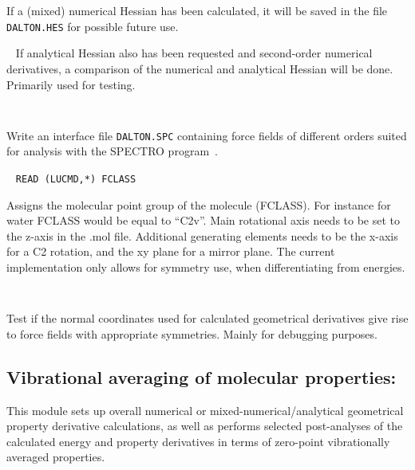 \begin{description}
If a (mixed) numerical Hessian has been calculated, it will be saved
in the file \verb|DALTON.HES| for possible future use.

\item[\Key{SDRTST}]\verb| |\newline
If analytical Hessian also has been requested and second-order
numerical derivatives, a comparison of the numerical and analytical
Hessian will be done. Primarily used for testing.

\item[\Key{SPECTRO INTERFACE}]\verb| |\newline

Write an interface file \verb|DALTON.SPC| containing force fields of
different orders suited for analysis with the SPECTRO
program~\cite{spectroref}.

\item[\Key{SYMMET}]\verb| |\newline
\verb|READ (LUCMD,*) FCLASS|

Assigns the molecular point group of the molecule (FCLASS). For
instance for water FCLASS would be equal to ``C2v''. Main rotational
axis needs to be set to the z-axis in the .mol file. Additional
generating elements needs to be the x-axis for a C2 rotation, and the
xy plane for a mirror plane. The current implementation only allows
for symmetry use, when differentiating from energies. 

\item[\Key{TEST N}]\verb| |\newline

Test if the normal coordinates used for calculated geometrical
derivatives give rise to force fields with appropriate
symmetries. Mainly for debugging purposes.

\end{description}

\subsection{Vibrational averaging of molecular properties: }
\label{sec:nmddrv.propan}

This module sets up overall numerical or mixed-numerical/analytical
geometrical property derivative calculations, as well as performs selected
post-analyses of the calculated energy and property derivatives in
terms of zero-point vibrationally averaged properties.

